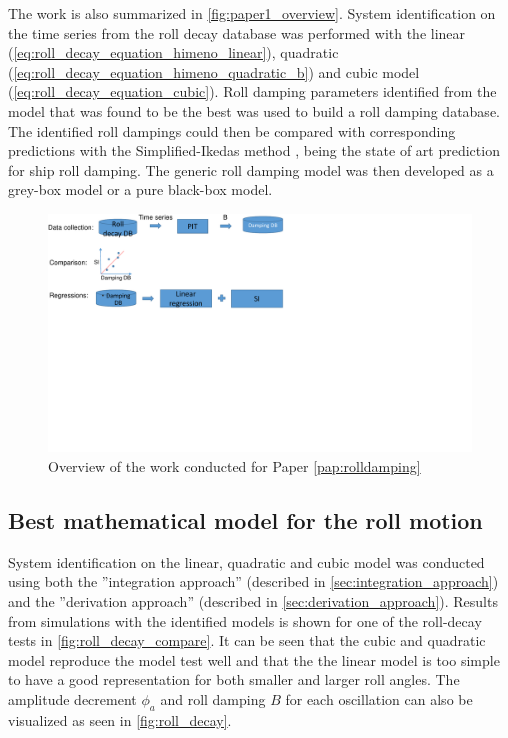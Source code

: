 \noindent The work is also summarized in \autoref{fig:paper1_overview}. System identification on the time series from the roll decay database was performed with the linear (\autoref{eq:roll_decay_equation_himeno_linear}), quadratic (\autoref{eq:roll_decay_equation_himeno_quadratic_b}) and cubic model (\autoref{eq:roll_decay_equation_cubic}). Roll damping parameters identified from the model that was found to be the best was used to build a roll damping database. The identified roll dampings could then be compared with corresponding predictions with the Simplified-Ikedas method \cite{kawahara_simple_2011}, being the state of art prediction for ship roll damping.
The generic roll damping model was then developed as a grey-box model or a pure black-box model.
\begin{figure}[H]
    \centering
    \includegraphics[width=\linewidth]{kappa/images/workflow.pdf}
    \caption{Overview of the work conducted for Paper \ref{pap:rolldamping}}
    \label{fig:paper1_overview}
\end{figure}

\subsection{Best mathematical model for the roll motion}
System identification on the linear, quadratic and cubic model was conducted using both the ''integration approach'' (described in \autoref{sec:integration_approach}) and the ''derivation approach'' (described in \autoref{sec:derivation_approach}).
Results from simulations with the identified models is shown for one of the roll-decay tests in \autoref{fig:roll_decay_compare}. It can be seen that the cubic and quadratic model reproduce the model test well and that the the linear model is too simple to have a good representation for both smaller and larger roll angles. The amplitude decrement $\phi_a$ and roll damping $B$ for each oscillation can also be visualized as seen in \autoref{fig:roll_decay}.

